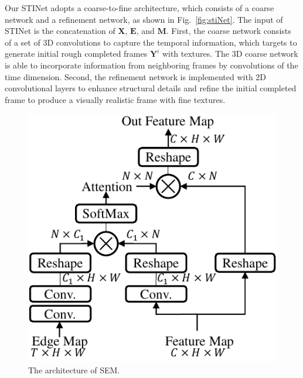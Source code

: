 



Our STINet adopts a coarse-to-fine architecture, which consists of a coarse network and a refinement network, as shown in Fig.~\ref{fig:stiNet}.
%
The input of STINet is the concatenation of $\boldsymbol{X}$, $\boldsymbol{E}$, and $\boldsymbol{M}$.
First, the coarse network consists of a set of 3D convolutions to capture the temporal information, which targets to generate initial rough completed frames $\boldsymbol{Y}^i$ with textures. 
The 3D coarse network is able to incorporate information from neighboring frames by convolutions of the time dimension.
Second, the refinement network is implemented with 2D convolutional layers to enhance structural details and refine the initial completed frame to produce a visually realistic frame with fine textures.

\begin{figure}[t]
	\centering
	\includegraphics[width=0.65\columnwidth]{SEM} %
	\caption{The architecture of SEM.}
	\label{SEM}
\end{figure}


